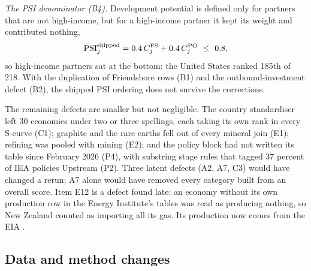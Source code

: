 \emph{The PSI denominator (B4).} Development potential is defined only for partners that are not
high-income, but for a high-income partner it kept its weight and contributed nothing,
\begin{equation}\label{eq:corr_psi_old}
  \mathrm{PSI}^{\text{shipped}}_j=0.4\,C^{\mathrm{FS}}_j+0.4\,C^{\mathrm{PO}}_j\ \le\ 0.8 ,
\end{equation}
so high-income partners sat at the bottom: the United States ranked 185th of 218. With the
duplication of Friendshore rows (B1) and the outbound-investment defect (B2), the shipped PSI ordering
does not survive the corrections.

The remaining defects are smaller but not negligible. The country standardiser left 30 economies
under two or three spellings, each taking its own rank in every S-curve (C1); graphite and the rare
earths fell out of every mineral join (E1); refining was pooled with mining (E2); and the policy
block had not written its table since February 2026 (P4), with substring stage rules that tagged
37 percent of IEA policies Upstream (P2). Three latent defects (A2, A7, C3) would have changed a
rerun; A7 alone would have removed every category built from an overall score. Item E12 is a
defect found late: an economy without its own production row in the Energy Institute's tables
\citep{ei2026statistical} was read as producing nothing, so New Zealand counted as importing all its
gas. Its production now comes from the EIA \citep{eia2026international}.

\subsection{Data and method changes}
\label{subsec:corr_changes}

